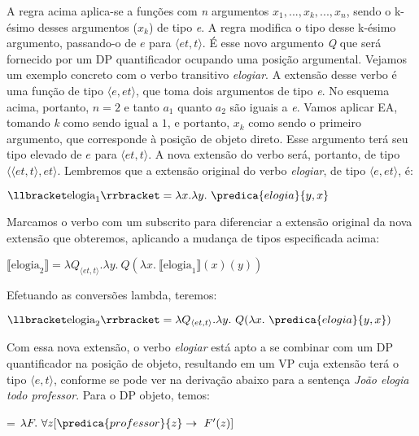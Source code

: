 \n A regra acima aplica-se a funções com \textit{n} argumentos $x_{1},...,x_{k},...,x_{n}$, sendo o k-ésimo desses argumentos ($x_{k}$) de tipo \textit{e}. A regra modifica o tipo desse k-ésimo argumento, passando-o de $e$ para $\langle et,t\rangle$. É esse novo argumento \textit{Q} que será fornecido por um DP quantificador ocupando uma posição argumental. Vejamos um exemplo concreto com o verbo transitivo \textit{elogiar}. A extensão desse verbo é uma função de tipo $\langle e,et\rangle$, que toma dois argumentos de tipo \textit{e}. No esquema acima, portanto, $n=2$ e tanto $a_{1}$ quanto $a_{2}$ são iguais a \textit{e}. Vamos aplicar EA, tomando \textit{k} como sendo igual a $1$, e portanto, $x_{k}$ como sendo o primeiro argumento, que corresponde à posição de objeto direto. Esse argumento terá seu tipo elevado de $e$ para $\langle et,t\rangle$. A nova extensão do verbo será, portanto, de tipo $\langle \langle et,t\rangle,et\rangle$. Lembremos que a extensão original do verbo \textit{elogiar}, de tipo $\langle e,et\rangle$, é:

\begin{exe}
	\ex $\llbracket \text{elogia}_{1} \rrbracket = \lambda x.\lambda y.\ \predica{elogia}{y,x}$
\end{exe}

\n Marcamos o verbo com um subscrito para diferenciar a extensão original da nova extensão que obteremos, aplicando a mudança de tipos especificada acima:

\begin{exe}
	\ex $\llbracket \text{elogia}_{2} \rrbracket = \lambda Q_{\langle et,t\rangle}.\lambda y.\ Q(\lambda x.\ \llbracket \text{elogia}_{1} \rrbracket (x)(y))$
\end{exe}

\n Efetuando as conversões lambda, teremos:

\begin{exe}
	\ex $\llbracket \text{elogia}_{2} \rrbracket = \lambda Q_{\langle et,t\rangle}.\lambda y.\ Q(\lambda x.\ \predica{elogia}{y,x})$
\end{exe}

\n Com essa nova extensão, o verbo \textit{elogiar} está apto a se combinar com um DP quantificador na posição de objeto, resultando em um VP cuja extensão terá o tipo $\langle e,t\rangle$, conforme se pode ver na derivação abaixo para a sentença \textit{João elogia todo professor}. Para o DP objeto, temos:

\begin{exe}
	\ex {} = $\lambda F.\ \forall z [\predica{professor}{z} \rightarrow\ F'(z)]$
\end{exe}


